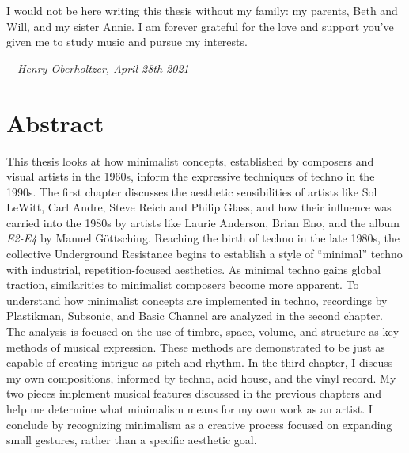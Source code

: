 \documentclass[12pt,twoside]{reedthesis}
\begin{document}
I would not be here writing this thesis without my family: my parents, Beth and Will, and my sister Annie. I am forever grateful for the love and support you've given me to study music and pursue my interests.
\newline

---\emph{Henry Oberholtzer, April 28th 2021}


	

    \tableofcontents
    \listoffigures

   \chapter*{Abstract}


This thesis looks at how minimalist concepts, established by composers and visual artists in the 1960s, inform the expressive techniques of techno in the 1990s. The first chapter discusses the aesthetic sensibilities of artists like Sol LeWitt, Carl Andre, Steve Reich and Philip Glass, and how their influence was carried into the 1980s by artists like Laurie Anderson, Brian Eno, and the album \emph{E2-E4} by Manuel G{\"o}ttsching. Reaching the birth of techno in the late 1980s, the collective Underground Resistance begins to establish a style of ``minimal'' techno with industrial, repetition-focused aesthetics. As minimal techno gains global traction, similarities to minimalist composers become more apparent. To understand how minimalist concepts are implemented in techno, recordings by Plastikman, Subsonic, and Basic Channel are analyzed in the second chapter. The analysis is focused on the use of timbre, space, volume, and structure as key methods of musical expression. These methods are demonstrated to be just as capable of creating intrigue as pitch and rhythm. In the third chapter, I discuss my own compositions, informed by techno, acid house, and the vinyl record. My two pieces implement musical features discussed in the previous chapters and help me determine what minimalism means for my own work as an artist. I conclude by recognizing minimalism as a creative process focused on expanding small gestures, rather than a specific aesthetic goal.
\end{document}

